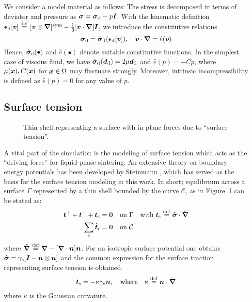 \documentclass[MikaelDissertation.tex]{subfiles}
\begin{document}
We consider a model material as follows: The stress is decomposed in terms of deviator and pressure as $\boldsymbol{\sigma} = \boldsymbol{\sigma}_{\mathrm{d}} - p\boldsymbol{I}$.
With the kinematic definition $\boldsymbol{\epsilon}_{\mathrm{d}}[\boldsymbol{v}]\overset{\mathrm{def}}{=}[\boldsymbol{v}\mathbin{\otimes}\boldsymbol{\nabla}]^{\mathrm{sym}}-\frac{1}{3}[\boldsymbol{v}\cdot\boldsymbol{\nabla}]\boldsymbol{I}$, we introduce the constitutive relations
\begin{equation}
    \boldsymbol{\sigma}_{\mathrm{d}} = \hat{\boldsymbol{\sigma}}_{\mathrm{d}}(\boldsymbol{\epsilon}_{\mathrm{d}}[\boldsymbol{v}]), \quad
    \boldsymbol{v}\cdot\boldsymbol{\nabla} = \hat{e}(p)
\label{eq201}
\end{equation}
Hence, $\hat{\boldsymbol{\sigma}}_{\mathrm{d}}(\bullet)$ and $\hat{e}(\bullet)$ denote suitable constitutive functions.
In the simplest case of viscous fluid, we have $\hat{\boldsymbol{\sigma}}_{\mathrm{d}}(\boldsymbol{d}_{\mathrm{d}})=2\mu\boldsymbol{d}_{\mathrm{d}}$ and $\hat{e}(p)=- C p$, where $\mu(\boldsymbol{x}), C(\boldsymbol{x})$ for $\boldsymbol{x}\in\Omega$ may fluctuate strongly.
Moreover, intrinsic incompressibility is defined as $\hat{e}(p)=0$ for any value of $p$.


\subsection{Surface tension}

\begin{figure}[th!]
    \centering
    
    \caption{Thin shell representing a surface with in-plane forces due to ``surface tension''.}
    \label{fig:surfacestress}
\end{figure}
A vital part of the simulation is the modeling of surface tension which acts as the ``driving force'' for liquid-phase sintering.
An extensive theory on boundary energy potentials has been developed by Steinmann \cite{steinmann_boundary_2008}, which has served as the basis for the surface tension modeling in this work.
In short; equilibrium across a surface $\Gamma$ represented by a thin shell bounded by the curve $\mathcal{C}$, as in Figure~\ref{fig:surfacestress} can be stated as:
\begin{align}
    \boldsymbol{t}^+ + \boldsymbol{t}^- + \boldsymbol{t}_{\mathrm{s}} &= \boldsymbol{0} \quad \text{on} \,\, \Gamma \quad \text{with } \boldsymbol{t}_{\mathrm{s}} \overset{\mathrm{def}}{=} \hat{\boldsymbol{\sigma}}\cdot\hat{\boldsymbol{\nabla}}
\label{eq103KR}\\
    \sum_i \hat{\boldsymbol{t}}_i &= \boldsymbol{0} \quad \text{on} \,\, \mathcal{C}
\label{eq104KR}
\end{align}
where $\hat{\boldsymbol{\nabla}} \overset{\mathrm{def}}{=} \boldsymbol{\nabla} - [\boldsymbol{\nabla}\cdot\boldsymbol{n}]\boldsymbol{n}$.
For an isotropic surface potential one obtains $\hat{\boldsymbol{\sigma}} = \gamma_{\mathrm{s}}[\boldsymbol{I}-\boldsymbol{n}\mathbin{\otimes}\boldsymbol{n}]$ and the common expression for the surface traction representing surface tension is obtained:
\begin{align}
 \boldsymbol{t}_{\mathrm{s}} = -\kappa \gamma_{\mathrm{s}} \boldsymbol{n},\quad \text{where}\quad \kappa \overset{\mathrm{def}}{=} \boldsymbol{n}\cdot\hat{\boldsymbol{\nabla}}
\end{align}
where $\kappa$ is the Gaussian curvature.
\end{document}
